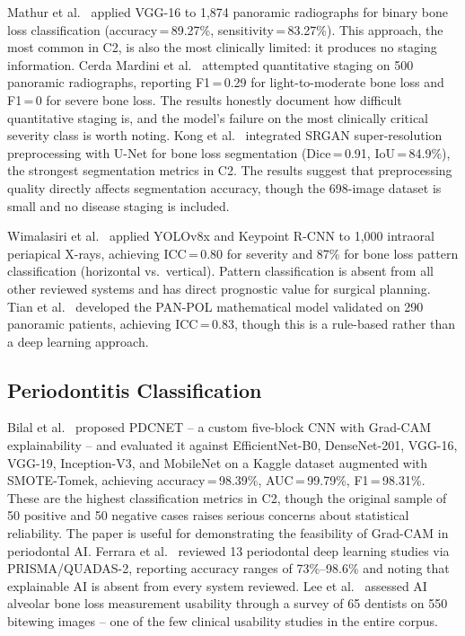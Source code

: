 \documentclass[conference]{IEEEtran}
\begin{document}
Mathur et al.~\cite{mathur2025comparative} applied VGG-16 to 1,874
panoramic radiographs for binary bone loss classification
(accuracy\,=\,89.27\%, sensitivity\,=\,83.27\%). This approach, the
most common in C2, is also the most clinically limited: it produces no
staging information. Cerda Mardini et al.~\cite{cerda2024determining}
attempted quantitative staging on 500 panoramic radiographs, reporting
F1\,=\,0.29 for light-to-moderate bone loss and F1\,=\,0 for severe bone
loss. The results honestly document how difficult quantitative staging
is, and the model's failure on the most clinically critical severity
class is worth noting. Kong et al.~\cite{kong2024integrating} integrated
SRGAN super-resolution preprocessing with U-Net for bone loss
segmentation (Dice\,=\,0.91, IoU\,=\,84.9\%), the strongest segmentation
metrics in C2. The results suggest that preprocessing quality directly
affects segmentation accuracy, though the 698-image dataset is small and
no disease staging is included.

Wimalasiri et al.~\cite{wimalasiri2025ai} applied YOLOv8x and Keypoint
R-CNN to 1,000 intraoral periapical X-rays, achieving ICC\,=\,0.80 for
severity and 87\% for bone loss pattern classification (horizontal
vs.\ vertical). Pattern classification is absent from all other reviewed
systems and has direct prognostic value for surgical planning. Tian et
al.~\cite{tian2025development} developed the PAN-POL mathematical model
validated on 290 panoramic patients, achieving ICC\,=\,0.83, though
this is a rule-based rather than a deep learning approach.

\subsection{Periodontitis Classification}

Bilal et al.~\cite{bilal2024pdcnet} proposed PDCNET -- a custom
five-block CNN with Grad-CAM explainability -- and evaluated it against
EfficientNet-B0, DenseNet-201, VGG-16, VGG-19, Inception-V3, and
MobileNet on a Kaggle dataset augmented with SMOTE-Tomek, achieving
accuracy\,=\,98.39\%, AUC\,=\,99.79\%, F1\,=\,98.31\%. These are the
highest classification metrics in C2, though the original sample of
50 positive and 50 negative cases raises serious concerns about
statistical reliability. The paper is useful for demonstrating the
feasibility of Grad-CAM in periodontal AI.
Ferrara et al.~\cite{ferrara2025applications} reviewed 13 periodontal
deep learning studies via PRISMA/QUADAS-2, reporting accuracy ranges of
73\%--98.6\% and noting that explainable AI is absent from every system
reviewed. Lee et al.~\cite{lee2025evaluation} assessed AI alveolar bone
loss measurement usability through a survey of 65 dentists on 550
bitewing images -- one of the few clinical usability studies in the
entire corpus.
\end{document}
